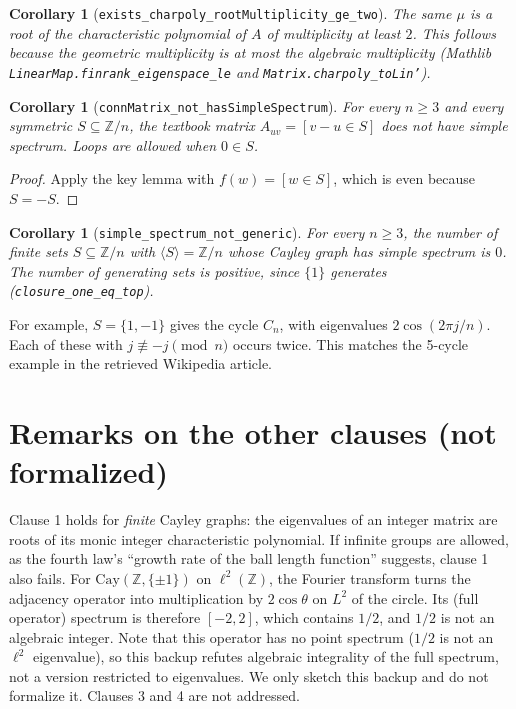 \documentclass[11pt]{article}
\newtheorem{corollary}[theorem]{Corollary}
\theoremstyle{definition}
\theoremstyle{remark}
\begin{document}
\begin{corollary}[\texttt{exists\_charpoly\_rootMultiplicity\_ge\_two}]
The same $\mu$ is a root of the characteristic polynomial of $A$ of multiplicity at least $2$.
This follows because the geometric multiplicity is at most the algebraic multiplicity (Mathlib
\texttt{LinearMap.finrank\_eigenspace\_le} and \texttt{Matrix.charpoly\_toLin'}).
\end{corollary}

\begin{corollary}[\texttt{connMatrix\_not\_hasSimpleSpectrum}]
For every $n\ge 3$ and every symmetric $S\subseteq\mathbb{Z}/n$, the textbook matrix
$A_{uv}=[v-u\in S]$ does not have simple spectrum. Loops are allowed when $0\in S$.
\end{corollary}
\begin{proof}
Apply the key lemma with $f(w)=[w\in S]$, which is even because $S=-S$.
\end{proof}

\begin{corollary}[\texttt{simple\_spectrum\_not\_generic}]
For every $n\ge 3$, the number of finite sets $S\subseteq\mathbb{Z}/n$ with
$\langle S\rangle=\mathbb{Z}/n$ whose Cayley graph has simple spectrum is $0$. The number of
generating sets is positive, since $\{1\}$ generates (\texttt{closure\_one\_eq\_top}).
\end{corollary}

For example, $S=\{1,-1\}$ gives the cycle $C_n$, with eigenvalues $2\cos(2\pi j/n)$. Each of these
with $j\not\equiv -j \pmod n$ occurs twice. This matches the 5-cycle example in the retrieved
Wikipedia article.

\section{Remarks on the other clauses (not formalized)}

Clause 1 holds for \emph{finite} Cayley graphs: the eigenvalues of an integer matrix are roots of
its monic integer characteristic polynomial. If infinite groups are allowed, as the fourth law's
``growth rate of the ball length function'' suggests, clause 1 also fails. For $\mathrm{Cay}(\mathbb{Z},\{\pm1\})$
on $\ell^2(\mathbb{Z})$, the Fourier transform turns the adjacency operator into multiplication by
$2\cos\theta$ on $L^2$ of the circle. Its (full operator) spectrum is therefore $[-2,2]$, which
contains $1/2$, and $1/2$ is not an algebraic integer. Note that this operator has no point
spectrum ($1/2$ is not an $\ell^2$ eigenvalue), so this backup refutes algebraic integrality of the
full spectrum, not a version restricted to eigenvalues. We only sketch this backup and do not formalize it. Clauses 3
and 4 are not addressed.
\end{document}
